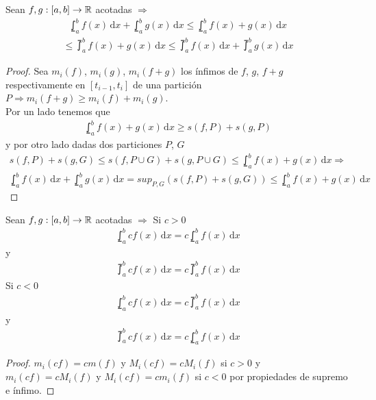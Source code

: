 \begin{prop}
  Sean $f, g: [a, b] \to \mathbb{R}$ acotadas $\Rightarrow$
  \begin{align*}
    \lowint_a^b f(x)\,\mathrm{d}x + \lowint_a^b g(x)\,\mathrm{d}x \leq \lowint_a^b f(x)+g(x)\,\mathrm{d}x
  \end{align*}
  \begin{align*}
    \leq \upint_a^b f(x) + g(x)\, \mathrm{d}x \leq \upint_a^b f(x)\, \mathrm{d}x + \upint_a^b g(x)\, \mathrm{d}x
  \end{align*}
  \begin{proof}
    Sea $m_i(f)$, $m_i(g)$, $m_i(f+g)$ los ínfimos de $f$, $g$, $f+g$ respectivamente en $[t_{i-1}, t_i]$ de una partición $P \Rightarrow m_i(f+g) \geq m_i(f) + m_i(g)$. \\
    Por un lado tenemos que \begin{align*}
      \lowint_a^b f(x)+g(x)\, \mathrm{d}x \geq s(f, P) + s(g, P)
    \end{align*} y por otro lado dadas dos particiones $P$, $G$ \begin{align*}
      s(f, P) + s(g, G) \leq s(f, P \cup G) + s(g, P \cup G) \leq \lowint_a^b f(x)+g(x)\,\mathrm{d}x \Rightarrow
    \end{align*}
    \begin{align*}
      \lowint_a^b f(x) \, \mathrm{d}x + \lowint_a^b g(x) \, \mathrm{d}x = sup_{P, G}(s(f, P)+s(g, G)) \leq \lowint_a^b f(x) + g(x)\, \mathrm{d}x
    \end{align*}
  \end{proof}
\end{prop}

\begin{prop}
  Sean $f, g: [a, b] \to \mathbb{R}$ acotadas $\Rightarrow$
  Si $c > 0$ \begin{align*}
    \lowint_a^b c f(x)\,\mathrm{d}x = c \lowint_a^b f(x)\,\mathrm{d}x
  \end{align*} y \begin{align*}
    \upint_a^b c f(x)\, \mathrm{d}x = c \upint_a^b f(x)\, \mathrm{d}x
  \end{align*}
  Si $c < 0$ \begin{align*}
    \lowint_a^b c f(x)\,\mathrm{d}x = c \upint_a^b f(x)\,\mathrm{d}x
  \end{align*} y \begin{align*}
    \upint_a^b c f(x)\,\mathrm{d}x = c \lowint_a^b f(x)\,\mathrm{d}x
  \end{align*}
  \begin{proof}
    $m_i(c f) = c m(f)$ y $M_i(c f) = c M_i(f)$ si $c > 0$ y $m_i(c f) = c M_i(f)$ y $M_i(c f) = c m_i(f)$ si $c < 0$ por propiedades de supremo e ínfimo.
  \end{proof}
\end{prop}

